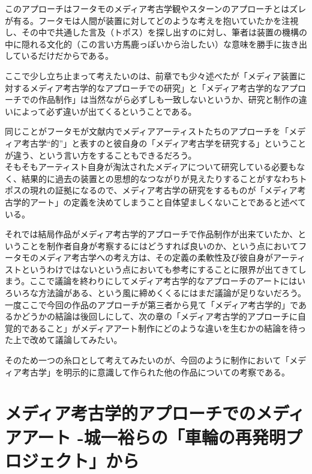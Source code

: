 \documentclass[a4paper,report]{jsbook}
\begin{document}
このアプローチはフータモのメディア考古学観やスターンのアプローチとはズレが有る。フータモは人間が装置に対してどのような考えを抱いていたかを注視し、その中で共通した言及（トポス）を探し出すのに対し、筆者は装置の機構の中に隠れる文化的（この言い方馬鹿っぽいから治したい）な意味を勝手に抜き出しているだけだからである。

ここで少し立ち止まって考えたいのは、前章でも少々述べたが「メディア装置に対するメディア考古学的なアプローチでの研究」と「メディア考古学的なアプローチでの作品制作」は当然ながら必ずしも一致しないというか、研究と制作の違いによって必ず違いが出てくるということである。

同じことがフータモが文献内でメディアアーティストたちのアプローチを「メディア考古学``的''」と表すのと彼自身の「メディア考古学を研究する」ということが違う、という言い方をすることもできるだろう。\\
そもそもアーティスト自身が淘汰されたメディアについて研究している必要もなく、結果的に過去の装置との思想的なつながりが見えたりすることがすなわちトポスの現れの証拠になるので、メディア考古学の研究をするものが「メディア考古学的アート」の定義を決めてしまうこと自体望ましくないことであると述べている。

それでは結局作品がメディア考古学的アプローチで作品制作が出来ていたか、ということを制作者自身が考察するにはどうすれば良いのか、という点においてフータモのメディア考古学への考え方は、その定義の柔軟性及び彼自身がアーティストというわけではないという点においても参考にすることに限界が出てきてしまう。ここで議論を終わりにしてメディア考古学的なアプローチのアートにはいろいろな方法論がある、という風に締めくくるにはまだ議論が足りないだろう。\\
一度ここで今回の作品のアプローチが第三者から見て「メディア考古学的」であるかどうかの結論は後回しにして、次の章の「メディア考古学的アプローチに自覚的であること」がメディアアート制作にどのような違いを生むかの結論を待った上で改めて議論してみたい。

そのため一つの糸口として考えてみたいのが、今回のように制作において「メディア考古学」を明示的に意識して作られた他の作品についての考察である。

\section{メディア考古学的アプローチでのメディアアート
-城一裕らの「車輪の再発明プロジェクト」から}\label{ux30e1ux30c7ux30a3ux30a2ux8003ux53e4ux5b66ux7684ux30a2ux30d7ux30edux30fcux30c1ux3067ux306eux30e1ux30c7ux30a3ux30a2ux30a2ux30fcux30c8--ux57ceux4e00ux88d5ux3089ux306eux8ecaux8f2aux306eux518dux767aux660eux30d7ux30edux30b8ux30a7ux30afux30c8ux304bux3089}
\end{document}
